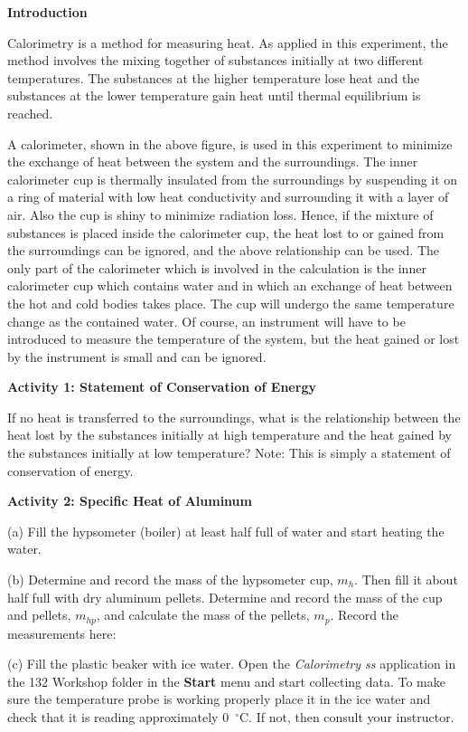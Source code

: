\bigskip
\textbf{Introduction} 

Calorimetry is a method for measuring heat. As applied in this experiment,
the method involves the mixing together of substances initially at
two different temperatures. The substances at the higher temperature
lose heat and the substances at the lower temperature gain heat until
thermal equilibrium is reached.


A calorimeter, shown in the above figure, is used in this experiment
to minimize the exchange of heat between the system and the surroundings.
The inner calorimeter cup is thermally insulated from the surroundings
by suspending it on a ring of material with low heat conductivity
and surrounding it with a layer of air. Also the cup is shiny to minimize
radiation loss. Hence, if the mixture of substances is placed inside
the calorimeter cup, the heat lost to or gained from the surroundings
can be ignored, and the above relationship can be used. The only part
of the calorimeter which is involved in the calculation is the inner
calorimeter cup which contains water and in which an exchange of heat
between the hot and cold bodies takes place. The cup will undergo
the same temperature change as the contained water. Of course, an
instrument will have to be introduced to measure the temperature of
the system, but the heat gained or lost by the instrument is small
and can be ignored.

\textbf{Activity 1: Statement of Conservation of Energy}

If no heat is transferred to the surroundings, what is the relationship
between the heat lost by the substances initially at high temperature
and the heat gained by the substances initially at low temperature?
Note: This is simply a statement of conservation of energy.
\answerspace{15mm}

\pagebreak[3]
\textbf{Activity 2: Specific Heat of Aluminum}

(a) Fill the hypsometer (boiler) at least half full of water and start
heating the water.

(b) Determine and record the mass of the hypsometer cup, $m_h$.
Then fill it about half full with dry aluminum pellets. Determine
and record the mass of the cup and pellets, $m_{hp}$, and calculate
the mass of the pellets, $m_p$. Record the measurements here:
\answerspace{10mm}

(c) Fill the plastic beaker with ice water. Open the \textit{Calorimetry ss}
application in the 132 Workshop folder in the {\bf Start} menu and start
collecting data. To make sure the temperature probe is working 
properly place it in the ice water and
check that it is reading approximately 0~$^{\circ }$C. If not,
then consult your instructor.

